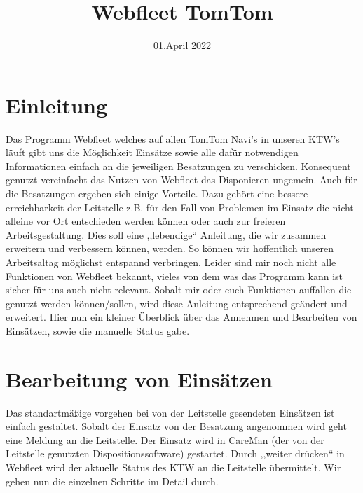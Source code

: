 \documentclass[a4paper,12pt]{scrartcl}
\title{Webfleet TomTom}
\date{01.April 2022}
\begin{document}
    \maketitle
    \tableofcontents
    
    \newpage
    \section{Einleitung}
    Das Programm Webfleet welches auf allen TomTom Navi's in unseren KTW's läuft gibt uns die Möglichkeit Einsätze sowie 
    alle dafür notwendigen Informationen einfach an die jeweiligen Besatzungen zu verschicken.
    Konsequent genutzt vereinfacht das Nutzen von Webfleet das Disponieren ungemein. Auch für die Besatzungen ergeben sich
    einige Vorteile. Dazu gehört eine bessere erreichbarkeit der Leitstelle z.B. für den Fall von Problemen im Einsatz die 
    nicht alleine vor Ort entschieden werden können oder auch zur freieren Arbeitsgestaltung. Dies soll eine ,,lebendige`` Anleitung, die wir 
    zusammen erweitern und verbessern können, werden. So können wir hoffentlich unseren Arbeitsaltag möglichst entspannd verbringen.
    Leider sind mir noch nicht alle Funktionen von Webfleet bekannt, vieles von dem was das Programm kann ist sicher
    für uns auch nicht relevant. Sobalt mir oder euch Funktionen auffallen die genutzt werden können/sollen, wird diese Anleitung
    entsprechend geändert und erweitert. 
    Hier nun ein kleiner Überblick über das Annehmen und Bearbeiten von Einsätzen, sowie die manuelle Status gabe.
    
    \section{Bearbeitung von Einsätzen}
    Das standartmäßige vorgehen bei von der Leitstelle gesendeten Einsätzen ist einfach gestaltet. Sobalt der Einsatz von
    der Besatzung angenommen wird geht eine Meldung an die Leitstelle. Der Einsatz wird in CareMan (der von der Leitstelle 
    genutzten Dispositionssoftware) gestartet. Durch ,,weiter drücken`` in Webfleet wird der aktuelle Status des KTW an die Leitstelle
    übermittelt. Wir gehen nun die einzelnen Schritte im Detail durch.
\end{document}
